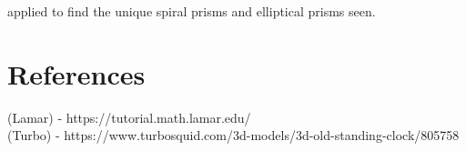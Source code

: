 \documentclass[a4paper,12pt]{article}
\begin{document}
applied to find the unique spiral prisms and elliptical prisms seen.

\section{References}
(Lamar) - https://tutorial.math.lamar.edu/\\
(Turbo) - https://www.turbosquid.com/3d-models/3d-old-standing-clock/805758
\end{document}
